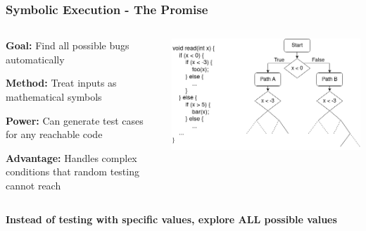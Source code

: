 \documentclass[aspectratio=169]{beamer}
\begin{document}
\begin{frame}
    \frametitle{Symbolic Execution - The Promise}
    \begin{columns}
        \begin{column}{0.6\textwidth}
            \textbf{Goal:} Find all possible bugs automatically
            
            \vspace{0.5em}
            \textbf{Method:} Treat inputs as mathematical symbols
            
            \vspace{0.5em}
            \textbf{Power:} Can generate test cases for any reachable code
            
            \vspace{0.5em}
            \textbf{Advantage:} Handles complex conditions that random testing cannot reach
        \end{column}
        \begin{column}{0.4\textwidth}
            \includegraphics[width=\textwidth]{./pic/symbolic_execution_promise.png}
        \end{column}
    \end{columns}
    
    \vspace{1em}
    \begin{center}
        \large\textbf{Instead of testing with specific values, explore ALL possible values}
    \end{center}
\end{frame}
\end{document}
